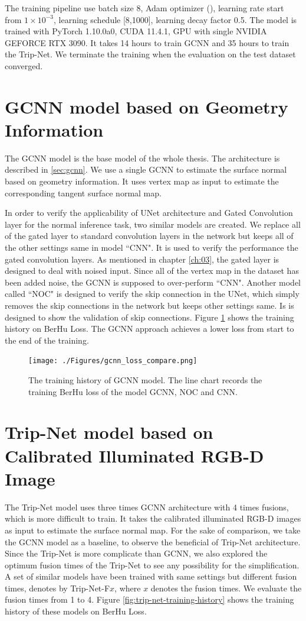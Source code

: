 \documentclass[border=15pt, multi, tikz]{article}
\begin{document}
The training pipeline use batch size $ 8 $,  Adam optimizer (\cite{adam}), learning rate start from  $ 1\times10^{-3} $, learning schedule [8,1000], learning decay factor 0.5. The model is trained with PyTorch 1.10.0a0, CUDA 11.4.1, GPU with single NVIDIA GEFORCE RTX 3090. It takes 14 hours to train GCNN and 35 hours to train the Trip-Net. We terminate the training when the evaluation on the test dataset converged.


\section{GCNN model based on Geometry Information}
The GCNN model is the base model of the whole thesis. The architecture is described in \ref{sec:gcnn}. We use a single GCNN to estimate the surface normal based on geometry information. It uses vertex map as input to estimate the corresponding tangent surface normal map. 

In order to verify the applicability of UNet architecture and Gated Convolution layer for the normal inference task, two similar models are created. 
We replace all of the gated layer to standard convolution layers in the network but keeps all of the other settings same in model ``CNN". It is used to verify the performance the gated convolution layers. As mentioned in chapter \ref{ch:03}, the gated layer is designed to deal with noised input. Since all of the vertex map in the dataset has been added noise, the GCNN is supposed to over-perform ``CNN". Another model called ``NOC" is designed to verify the skip connection in the UNet, which simply removes the skip connections in the network but keeps other settings same. Is is designed to show the validation of skip connections. Figure \ref{fig:gcnn-training-history} shows the training history on BerHu Loss. The GCNN approach achieves a lower loss from start to the end of the training.

\begin{figure}[th]
	\centering
	\texttt{[image: ./Figures/gcnn\_loss\_compare.png]}
	\caption{The training history of GCNN model. The line chart records the training BerHu loss of the model GCNN, NOC and CNN.}
	\label{fig:gcnn-training-history}
\end{figure}

\section{Trip-Net model based on Calibrated Illuminated RGB-D Image}
The Trip-Net model uses three times GCNN architecture with 4 times fusions, which is more difficult to train. It takes the calibrated illuminated RGB-D images as input to estimate the surface normal map. For the sake of comparison, we take the GCNN model as a baseline, to observe the beneficial of Trip-Net architecture. Since the Trip-Net is more complicate than GCNN, we also explored the optimum fusion times of the Trip-Net to see any possibility for the simplification. A set of similar models have been trained with same settings but different fusion times, denotes by Trip-Net-F$ x $, where $ x $ denotes the fusion times. We evaluate the fusion times from 1 to 4. Figure \ref{fig:trip-net-training-history} shows the training history of these models on BerHu Loss. 
\end{document}
